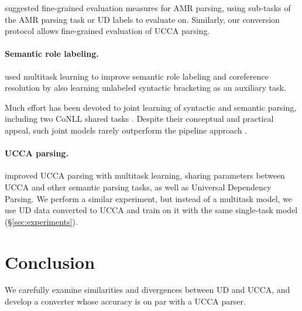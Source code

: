 \documentclass[11pt,a4paper]{article}
\begin{document}
 suggested fine-grained evaluation measures
for AMR parsing, using sub-tasks of the AMR parsing task or UD labels to evaluate on.
Similarly, our conversion protocol allows fine-grained evaluation of UCCA parsing.

\paragraph{Semantic role labeling.}

 used multitask learning to improve semantic role labeling and coreference resolution
by also learning unlabeled syntactic bracketing as an auxiliary task.

Much effort has been devoted to joint learning of syntactic
and semantic parsing, including
two CoNLL shared tasks \cite{surdeanu2008conll,hajivc2009conll}.
Despite their conceptual and practical appeal, such joint models rarely outperform
the pipeline approach %
\cite{lluis2008joint,henderson2013multilingual,D15-1169,swayamdipta-EtAl:2016:CoNLL,swayamdipta2017frame}.

\paragraph{UCCA parsing.}

 improved UCCA parsing with multitask learning, sharing parameters
between UCCA and other semantic parsing tasks, as well as Universal Dependency Parsing.
We perform a similar experiment, but instead of a multitask model,
we use UD data converted to UCCA and train on it with the same single-task model (\S\ref{sec:experiments}).


\section{Conclusion}\label{sec:conclusion}

We carefully examine similarities and divergences between UD and UCCA,
and develop a converter whose accuracy is on par with a UCCA parser.




\end{document}
